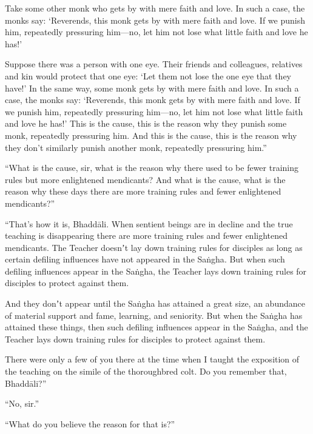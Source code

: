 \documentclass[12pt,openany]{book}%
\begin{document}
Take some other monk who gets by with mere faith and love. In such a case, the monks say: ‘Reverends, this monk gets by with mere faith and love. If we punish him, repeatedly pressuring him—no, let him not lose what little faith and love he has!’ 

Suppose there was a person with one eye. Their friends and colleagues, relatives and kin would protect that one eye: ‘Let them not lose the one eye that they have!’ In the same way, some monk gets by with mere faith and love. In such a case, the monks say: ‘Reverends, this monk gets by with mere faith and love. If we punish him, repeatedly pressuring him—no, let him not lose what little faith and love he has!’ This is the cause, this is the reason why they punish some monk, repeatedly pressuring him. And this is the cause, this is the reason why they don’t similarly punish another monk, repeatedly pressuring him.” 

“What is the cause, sir, what is the reason why there used to be fewer training rules but more enlightened mendicants? And what is the cause, what is the reason why these days there are more training rules and fewer enlightened mendicants?” 

“That’s how it is, \textsanskrit{Bhaddāli}. When sentient beings are in decline and the true teaching is disappearing there are more training rules and fewer enlightened mendicants. The Teacher doesnʼt lay down training rules for disciples as long as certain defiling influences have not appeared in the \textsanskrit{Saṅgha}. But when such defiling influences appear in the \textsanskrit{Saṅgha}, the Teacher lays down training rules for disciples to protect against them. 

And they donʼt appear until the \textsanskrit{Saṅgha} has attained a great size, an abundance of material support and fame, learning, and seniority. But when the \textsanskrit{Saṅgha} has attained these things, then such defiling influences appear in the \textsanskrit{Saṅgha}, and the Teacher lays down training rules for disciples to protect against them. 

There were only a few of you there at the time when I taught the exposition of the teaching on the simile of the thoroughbred colt. Do you remember that, \textsanskrit{Bhaddāli}?” 

“No, sir.” 

“What do you believe the reason for that is?” 
\end{document}
